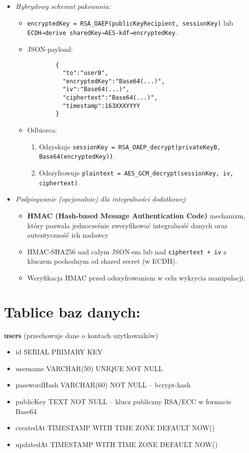 \documentclass[a4paper,12pt]{article}
\begin{document}
\begin{itemize}
\begin{itemize}
        \item \emph{Hybrydowy schemat pakowania:}
        \begin{itemize}
            \item   \texttt{encryptedKey = RSA\_OAEP(publicKeyRecipient, sessionKey)} lub \texttt{ECDH→derive sharedKey→AES-kdf→encryptedKey}.
            \item   JSON-payload:
            \begin{verbatim}
        {
          "to":"userB",
          "encryptedKey":"Base64(...)",
          "iv":"Base64(...)",
          "ciphertext":"Base64(...)",
          "timestamp":163XXXYYYY
        }
            \end{verbatim}
            \item   Odbiorca:
            \begin{enumerate}
                \item   Odzyskuje \texttt{sessionKey = RSA\_OAEP\_decrypt(privateKeyB, Base64(encryptedKey))}.
                \item   Odszyfrowuje \texttt{plaintext = AES\_GCM\_decrypt(sessionKey, iv, ciphertext)}.
            \end{enumerate}
        \end{itemize}
        \item \emph{Podpisywanie (opcjonalnie) dla integralności dodatkowej:}
        \begin{itemize}
            \item \textbf{HMAC (Hash-based Message Authentication Code)} mechanizm, który pozwala jednocześnie zweryfikować integralność danych oraz autentyczność ich nadawcy
            \item HMAC-SHA256 nad całym JSON-em lub nad \texttt{ciphertext + iv} z kluczem pochodnym od shared secret (w ECDH).
            \item Weryfikacja HMAC przed odszyfrowaniem w celu wykrycia manipulacji.
        \end{itemize}
    \end{itemize}
\end{itemize}

\section*{Tablice baz danych:}

\textbf{users} (przechowuje dane o kontach użytkowników)
\begin{itemize}
    \item id SERIAL PRIMARY KEY
    \item username VARCHAR(50) UNIQUE NOT NULL
    \item passwordHash VARCHAR(60) NOT NULL  – bcrypt-hash
    \item publicKey TEXT NOT NULL  – klucz publiczny RSA/ECC w formacie Base64
    \item createdAt TIMESTAMP WITH TIME ZONE DEFAULT NOW()
    \item updatedAt TIMESTAMP WITH TIME ZONE DEFAULT NOW()
\end{itemize}
\end{document}
